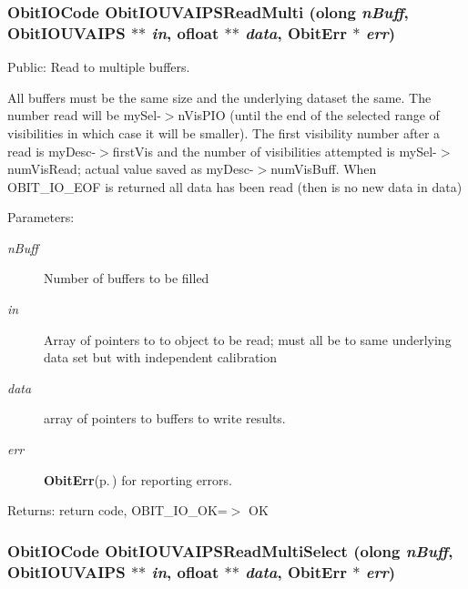 \subsubsection{\setlength{\rightskip}{0pt plus 5cm}Obit\-IOCode Obit\-IOUVAIPSRead\-Multi ({\bf olong} {\em n\-Buff}, {\bf Obit\-IOUVAIPS} $\ast$$\ast$ {\em in}, {\bf ofloat} $\ast$$\ast$ {\em data}, {\bf Obit\-Err} $\ast$ {\em err})}\label{ObitIOUVAIPS_8h_a15}


Public: Read to multiple buffers. 

All buffers must be the same size and the underlying dataset the same. The number read will be my\-Sel-$>$n\-Vis\-PIO (until the end of the selected range of visibilities in which case it will be smaller). The first visibility number after a read is my\-Desc-$>$first\-Vis and the number of visibilities attempted is my\-Sel-$>$num\-Vis\-Read; actual value saved as my\-Desc-$>$num\-Vis\-Buff. When OBIT\_\-IO\_\-EOF is returned all data has been read (then is no new data in data) \begin{Desc}
\item[Parameters:]
\begin{description}
\item[{\em n\-Buff}]Number of buffers to be filled \item[{\em in}]Array of pointers to to object to be read; must all be to same underlying data set but with independent calibration \item[{\em data}]array of pointers to buffers to write results. \item[{\em err}]{\bf Obit\-Err}{\rm (p.\,\pageref{structObitErr})} for reporting errors. \end{description}
\end{Desc}
\begin{Desc}
\item[Returns:]return code, OBIT\_\-IO\_\-OK=$>$ OK \end{Desc}
\subsubsection{\setlength{\rightskip}{0pt plus 5cm}Obit\-IOCode Obit\-IOUVAIPSRead\-Multi\-Select ({\bf olong} {\em n\-Buff}, {\bf Obit\-IOUVAIPS} $\ast$$\ast$ {\em in}, {\bf ofloat} $\ast$$\ast$ {\em data}, {\bf Obit\-Err} $\ast$ {\em err})}\label{ObitIOUVAIPS_8h_a17}


